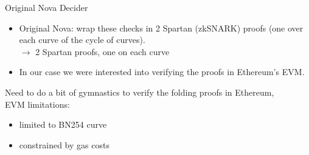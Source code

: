 \documentclass[t]{beamer} \usefonttheme[onlymath]{serif}
\begin{document}
\begin{frame}{Original Nova Decider}
  \begin{itemize}
    \item Original Nova: wrap these checks in 2 Spartan (zkSNARK) proofs (one over each curve of the cycle of curves).\\
      $\longrightarrow$ 2 Spartan proofs, one on each curve\\
    \item In our case we were interested into verifying the proofs in Ethereum's EVM.
  \end{itemize}

  Need to do a bit of gymnastics to verify the folding proofs in Ethereum,\\
  EVM limitations:
  \begin{itemize}
    \item limited to BN254 curve
    \item constrained by gas costs
  \end{itemize}
\end{frame}
\end{document}
